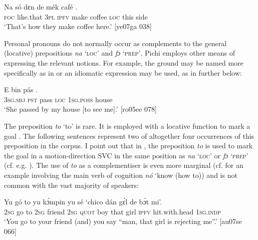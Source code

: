 \ea%
    \label{ex:key:906}
    \gll Na  só    dɛn  de  mék    café        .\\
\textsc{foc}  like.that  \textsc{3pl}  \textsc{ipfv}  make  coffee  \textsc{loc}  this  side  \\

\glt ‘That’s how they make coffee here.’ [ye07ga 038]
\z

Personal pronouns do not normally occur as complements to the general (locative) prepositions \textit{na} ‘\textsc{loc’} and \textit{fɔ} ‘\textsc{prep’}. Pichi employs other means of expressing the relevant notions. For example, the ground may be named more specifically as in  or an idiomatic expression may be used, as in  further below: 


\ea%
    \label{ex:key:907}
    \gll E    bin  pás        .\\
\textsc{3sg.sbj}  \textsc{pst}  pass  \textsc{loc}  \textsc{1sg.poss}  house\\

\glt ‘She passed by my house [to see me].’ [ro05ee 078]
\z

The preposition \textit{to} ‘to’ is rare. It is employed with a locative function to mark a goal . The following sentences represent two of altogether four occurrences of this preposition in the corpus. I point out that in , the preposition \textit{to} is used to mark the goal in a motion-direction SVC in the same position as \textit{na} ‘\textsc{loc}’ or \textit{fɔ} ‘\textsc{prep}’ (cf. e.g. ). The use of \textit{to} as a complementiser is even more marginal (cf.  for an example involving the main verb of cognition \textit{nó} ‘know (how to)) and is not common with the vast majority of speakers:


\ea%
    \label{ex:key:908}
    \gll Yu  gó  to  yu  kɔ́mpin  yu  sé    ‘chico  dán  gɛ́l  de
    bɔ́t        mi’.\\
    \textsc{2sg}  go  to  \textsc{2sg}  friend  \textsc{2sg}  \textsc{quot}    boy    that  girl  \textsc{ipfv} 
hit.with.head    \textsc{1sg.indp}\\

\glt ‘You go to your friend (and) you say “man, that girl is rejecting me”.’ [au07se 066]
\z


